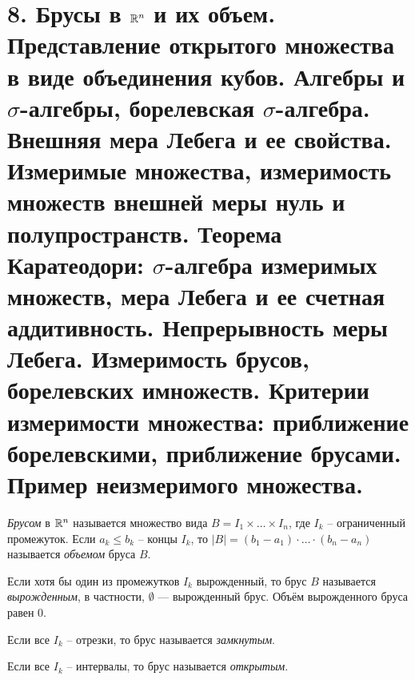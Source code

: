\section{8. Брусы в $\mathbb{R}^n$ и их объем. Представление открытого множества в виде объединения кубов. Алгебры и $\sigma$-алгебры, борелевская $\sigma$-алгебра. Внешняя мера Лебега и ее свойства. Измеримые множества, измеримость множеств внешней меры нуль и полупространств. Теорема Каратеодори: $\sigma$-алгебра измеримых множеств, мера Лебега и ее счетная аддитивность. Непрерывность меры Лебега. Измеримость брусов, борелевских имножеств. Критерии измеримости множества: приближение борелевскими, приближение брусами. Пример неизмеримого множества.}

\begin{definition}
    \textit{Брусом} в $\mathbb{R}^{n}$ называется множество вида $B = I_{1} \times \ldots \times I_{n}$, где $I_{k}$ -- ограниченный промежуток. Если $a_{k} \leq b_{k}$ -- концы $I_{k}$, то $|B| = (b_{1} - a_{1})\cdot \ldots \cdot(b_{n} - a_{n})$ называется \textit{объемом} бруса $B$.

    Если хотя бы один из промежутков $I_k$ вырожденный, то брус $B$ называется \emph{вырожденным}, в частности, $\emptyset$ --- вырожденный брус. Объём вырожденного бруса равен 0.

    Если все $I_{k}$ -- отрезки, то брус называется \textit{замкнутым}.
    
    Если все $I_{k}$ -- интервалы, то брус называется \textit{открытым}.

\end{definition}

